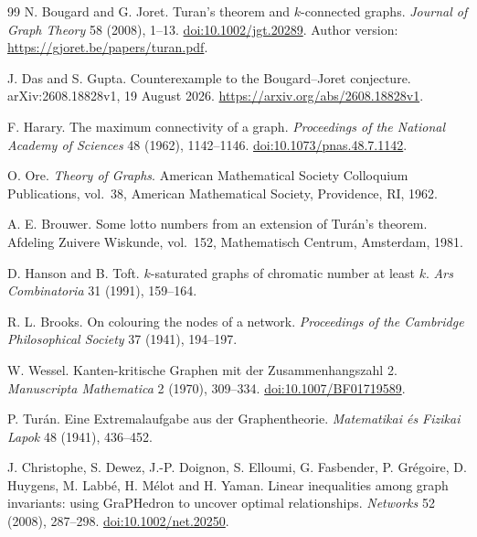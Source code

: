 \documentclass[11pt]{article}
\theoremstyle{remark}
\begin{document}












\clearpage
\begin{thebibliography}{99}
\small
{} N. Bougard and G. Joret.
Turan's theorem and $k$-connected graphs.
\emph{Journal of Graph Theory} 58 (2008), 1--13.
\href{https://doi.org/10.1002/jgt.20289}{doi:10.1002/jgt.20289}.
Author version: \url{https://gjoret.be/papers/turan.pdf}.

 J. Das and S. Gupta.
Counterexample to the Bougard--Joret conjecture.
arXiv:2608.18828v1, 19 August 2026.
\url{https://arxiv.org/abs/2608.18828v1}.

 F. Harary.
The maximum connectivity of a graph.
\emph{Proceedings of the National Academy of Sciences} 48 (1962), 1142--1146.
\href{https://doi.org/10.1073/pnas.48.7.1142}{doi:10.1073/pnas.48.7.1142}.

 O. Ore.
\emph{Theory of Graphs}.
American Mathematical Society Colloquium Publications, vol.~38, American Mathematical Society, Providence, RI, 1962.

 A. E. Brouwer.
Some lotto numbers from an extension of Tur\'an's theorem.
Afdeling Zuivere Wiskunde, vol.~152, Mathematisch Centrum, Amsterdam, 1981.

 D. Hanson and B. Toft.
$k$-saturated graphs of chromatic number at least $k$.
\emph{Ars Combinatoria} 31 (1991), 159--164.

 R. L. Brooks.
On colouring the nodes of a network.
\emph{Proceedings of the Cambridge Philosophical Society} 37 (1941), 194--197.

 W. Wessel.
Kanten-kritische Graphen mit der Zusammenhangszahl 2.
\emph{Manuscripta Mathematica} 2 (1970), 309--334.
\href{https://doi.org/10.1007/BF01719589}{doi:10.1007/BF01719589}.

 P. Tur\'an.
Eine Extremalaufgabe aus der Graphentheorie.
\emph{Matematikai \'es Fizikai Lapok} 48 (1941), 436--452.

 J. Christophe, S. Dewez, J.-P. Doignon, S. Elloumi, G. Fasbender, P. Gr\'egoire, D. Huygens, M. Labb\'e, H. M\'elot and H. Yaman.
Linear inequalities among graph invariants: using GraPHedron to uncover optimal relationships.
\emph{Networks} 52 (2008), 287--298.
\href{https://doi.org/10.1002/net.20250}{doi:10.1002/net.20250}.


\end{thebibliography}
\end{document}
